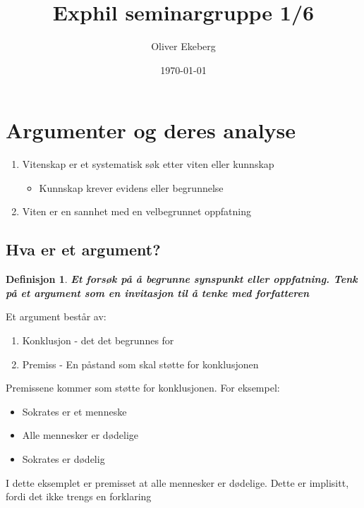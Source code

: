 \documentclass[11pt]{article}
\title{Exphil seminargruppe 1/6}
\author{Oliver Ekeberg}
\date{\today}
\newtheorem{definition}{Definisjon}
\begin{document}
\maketitle

\section{Argumenter og deres analyse}

\begin{flushleft}
    \begin{enumerate}
        \item Vitenskap er et systematisk søk etter viten eller kunnskap
        \begin{itemize}
            \item Kunnskap krever evidens eller begrunnelse
        \end{itemize}
        \item Viten er en sannhet med en velbegrunnet oppfatning
    \end{enumerate}
\end{flushleft}

\subsection{Hva er et argument?}

\begin{definition}
    \textbf{Et forsøk på å begrunne synspunkt eller oppfatning. Tenk på et argument som en invitasjon til å tenke med forfatteren}
\end{definition}

Et argument består av:
\begin{enumerate}
    \item Konklusjon - det det begrunnes for  
    \item Premiss - En påstand som skal støtte for konklusjonen
\end{enumerate}

Premissene kommer som støtte for konklusjonen.
For eksempel:
\begin{itemize}
    \item Sokrates er et menneske
    \item Alle mennesker er dødelige
    \item Sokrates er dødelig
\end{itemize} 

I dette eksemplet er premisset at alle mennesker er dødelige.
Dette er implisitt, fordi det ikke trengs en forklaring
\end{document}
